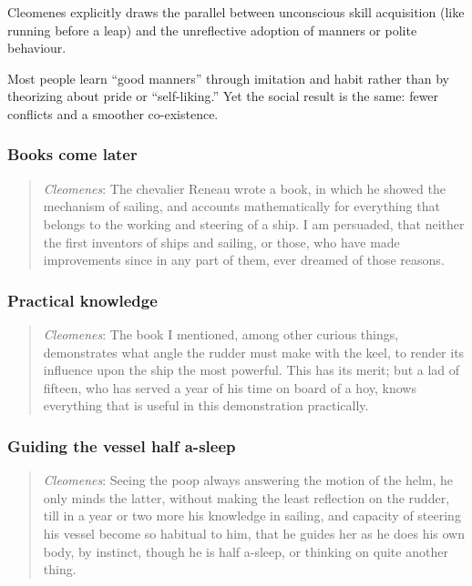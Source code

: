             Cleomenes explicitly draws the parallel between unconscious skill acquisition (like running before a leap) and the unreflective adoption of manners or polite behaviour.
            
            Most people learn “good manners” through imitation and habit rather than by theorizing about pride or “self-liking.” Yet the social result is the same: fewer conflicts and a smoother co-existence.

        \subsubsection{Books come later}

            \begin{quote}
                \textit{Cleomenes}: The chevalier Reneau wrote a book, in which he showed the mechanism of sailing, and accounts mathematically for everything that belongs to the working and steering of a ship. I am persuaded, that neither the first inventors of ships and sailing, or those, who have made improvements since in any part of them, ever dreamed of those reasons.
            \end{quote}

        \subsubsection{Practical knowledge}

            \begin{quote}
                \textit{Cleomenes}: The book I mentioned, among other curious things, demonstrates what angle the rudder must make with the keel, to render its influence upon the ship the most powerful. This has its merit; but a lad of fifteen, who has served a year of his time on board of a hoy, knows everything that is useful in this demonstration practically.
            \end{quote}

        \subsubsection{Guiding the vessel half a-sleep}

            \begin{quote}
                \textit{Cleomenes}: Seeing the poop always answering the motion of the helm, he only minds the latter, without making the least reflection on the rudder, till in a year or two more his knowledge in sailing, and capacity of steering his vessel become so habitual to him, that he guides her as he does his own body, by instinct, though he is half a-sleep, or thinking on quite another thing.
            \end{quote}

